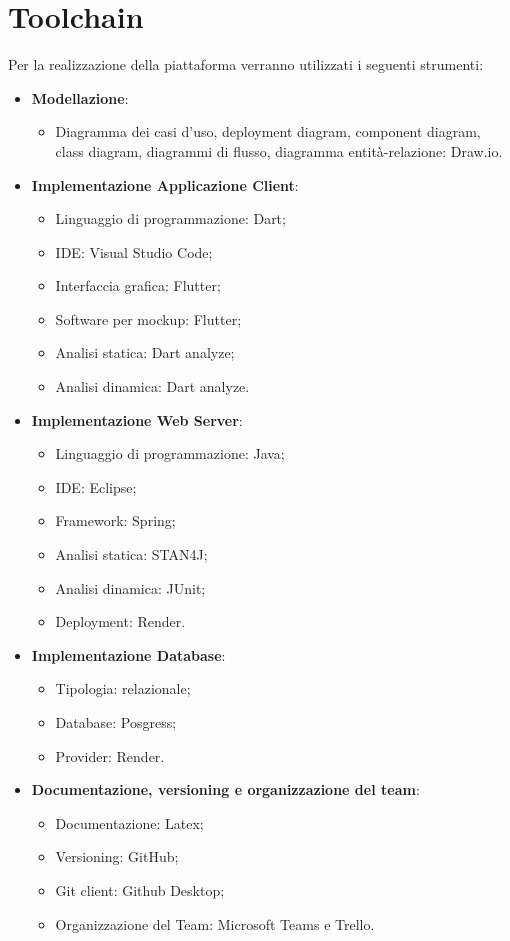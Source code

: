 \section{Toolchain}
Per la realizzazione della piattaforma verranno utilizzati i seguenti strumenti:
\begin{itemize}
	\item \textbf{Modellazione}:
	\begin{itemize}
		\item Diagramma dei casi d'uso, deployment diagram, component diagram, class
		diagram, diagrammi di flusso, diagramma entità-relazione: Draw.io.
	\end{itemize}
	\item \textbf{Implementazione Applicazione Client}:
	\begin{itemize}
		\item Linguaggio di programmazione: Dart;
		\item IDE: Visual Studio Code;
		\item Interfaccia grafica: Flutter;
		\item Software per mockup: Flutter;
		\item Analisi statica: Dart analyze;
		\item Analisi dinamica: Dart analyze.
	\end{itemize}
	\item \textbf{Implementazione Web Server}:
	\begin{itemize}
		\item Linguaggio di programmazione: Java;
		\item IDE: Eclipse;
		\item Framework: Spring;
		\item Analisi statica: STAN4J;
		\item Analisi dinamica: JUnit;
		\item Deployment: Render.
	\end{itemize}
	\item \textbf{Implementazione Database}:
	\begin{itemize}
		\item Tipologia: relazionale;
		\item Database: Posgress;
		\item Provider: Render.
	\end{itemize}
	\item \textbf{Documentazione, versioning e organizzazione del team}:
	\begin{itemize}
		\item Documentazione: Latex;
		\item Versioning: GitHub;
		\item Git client: Github Desktop;
		\item Organizzazione del Team: Microsoft Teams e Trello.
	\end{itemize}
\end{itemize}